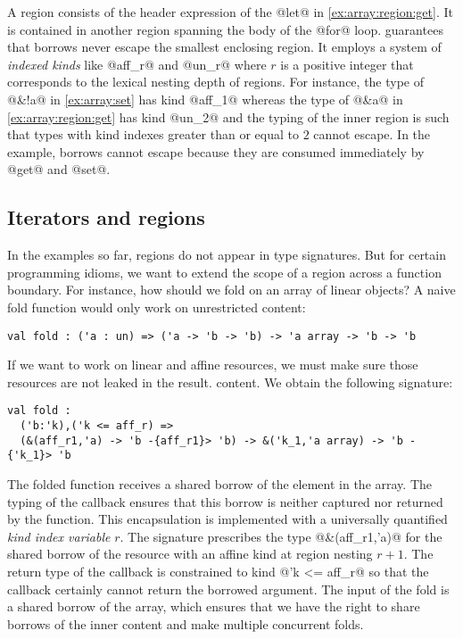 A region consists of the header expression of the @let@ in
\cref{ex:array:region:get}. It is contained in another region
spanning the body of the @for@ loop. \lang guarantees that borrows
never escape the smallest enclosing region. It employs a system of
\emph{indexed kinds} like @aff_r@ and @un_r@ where
$r$ is a positive integer that corresponds to the lexical nesting
depth of regions. For instance, the type of @&!a@ in
\cref{ex:array:set} has kind @aff_1@ whereas the type of
@&a@ in \cref{ex:array:region:get} has kind
@un_2@ and the typing of the inner region is such that types with
kind indexes greater than or equal to $2$ cannot escape.
In the example, borrows cannot escape  because they are consumed
immediately by @get@ and @set@.


\subsection{Iterators and regions}
\label{tuto:vector}

In the examples so far, regions do not appear in type signatures.
But for certain programming idioms, we want to extend the scope of a
region across a function boundary.
For instance, how should we fold on an array of linear objects?
A naive fold function would only work on unrestricted content:
\begin{lstlisting}
val fold : ('a : un) => ('a -> 'b -> 'b) -> 'a array -> 'b -> 'b
\end{lstlisting}

If we want to work on linear and affine resources,
we must make sure those resources are not leaked in the result.
content. We obtain the following signature:
\begin{lstlisting}
val fold :
  ('b:'k),('k <= aff_r) =>
  (&(aff_r1,'a) -> 'b -{aff_r1}> 'b) -> &('k_1,'a array) -> 'b -{'k_1}> 'b
\end{lstlisting}

The folded function receives a shared borrow of the element in the array.
The typing of the callback ensures
that this borrow is neither captured nor returned by the function.
%
This encapsulation is implemented with a universally quantified \emph{kind index variable} $r$.
The signature prescribes the type @&(aff_r1,'a)@ for the
shared borrow of the resource with an affine kind at region nesting $r+1$. The return
type of the callback is constrained to kind @'k <= aff_r@
so that the callback certainly cannot return the borrowed argument.
%
The input of the fold is a shared borrow of the array,
which ensures that we have the right to share borrows of the inner content and
make multiple concurrent folds.

